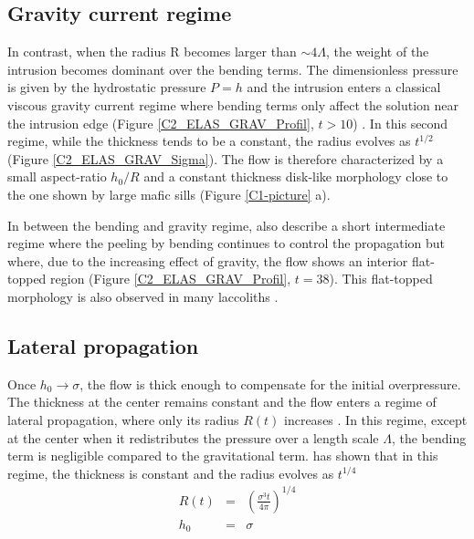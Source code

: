 \subsection{Gravity current regime}
\label{C2-sec:grav-curr-regime}

In contrast,  when the radius  R becomes larger than  $\sim 4\Lambda$,
the weight of  the intrusion becomes dominant over  the bending terms.
The  dimensionless  pressure  is  given by  the  hydrostatic  pressure
$P = h$  and the intrusion enters a classical  viscous gravity current
regime where bending terms only affect the solution near the intrusion
edge         (Figure        \ref{C2_ELAS_GRAV_Profil},         $t>10$)
\citep{Huppert:1982a,Michaut:2011kg,Lister:2013ia}.   In  this  second
regime, while the thickness tends to be a constant, the radius evolves
as $t^{1/2}$ (Figure \ref{C2_ELAS_GRAV_Sigma}).  The flow is therefore
characterized by a small aspect-ratio $h_0/R$ and a constant thickness
disk-like  morphology close  to the  one  shown by  large mafic  sills
(Figure \ref{C1-picture} a).

In between the bending  and gravity regime, \citet{Lister:2013ia} also
describe  a short  intermediate regime  where the  peeling by  bending
continues to control the propagation  but where, due to the increasing
effect  of gravity,  the  flow shows  an  interior flat-topped  region
(Figure   \ref{C2_ELAS_GRAV_Profil},    $t=38$).    This   flat-topped
morphology     is     also     observed     in     many     laccoliths
\citep{Koch:1981if,Bunger:2011cb}.

\subsection{Lateral propagation}
\label{C2-sec:lateral-propagation}

Once $h_0\rightarrow \sigma$,  the flow is thick  enough to compensate
for  the initial  overpressure. The  thickness at  the center  remains
constant and  the flow enters  a regime of lateral  propagation, where
only its radius $R(t)$ increases \citep{Michaut:2011kg}. In this
regime, except at the center when it redistributes the pressure over a
length scale $\Lambda$, the bending term is negligible compared to the
gravitational  term. \citet{Michaut:2011kg}  has  shown  that in  this
regime, the thickness is constant and the radius evolves as $t^{1/4}$
\begin{eqnarray}
  R(t) &=& \left(\frac{\sigma^3 t}{4\pi}\right)^{1/4}\label{C2-Scaling-R-Propa}\\
  h_0 &=& \sigma\label{C2-Scaling-H-Propa}
\end{eqnarray} 

